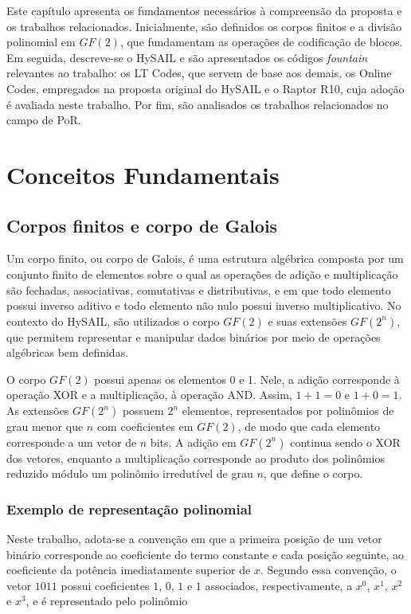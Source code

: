 Este capítulo apresenta os fundamentos necessários à compreensão da proposta e os trabalhos relacionados. Inicialmente, são definidos os corpos finitos e a divisão polinomial em $GF(2)$, que fundamentam as operações de codificação de blocos. Em seguida, descreve-se o HySAIL e são apresentados os códigos \emph{fountain} relevantes ao trabalho: os LT Codes, que servem de base aos demais, os Online Codes, empregados na proposta original do HySAIL e o Raptor R10, cuja adoção é avaliada neste trabalho. Por fim, são analisados os trabalhos relacionados no campo de \acrshort{PoR}.

\section{Conceitos Fundamentais}

\subsection{Corpos finitos e corpo de Galois}%
Um corpo finito, ou corpo de Galois, é uma estrutura algébrica composta por um conjunto finito de elementos sobre o qual as operações de adição e multiplicação são fechadas, associativas, comutativas e distributivas, e em que todo elemento possui inverso aditivo e todo elemento não nulo possui inverso multiplicativo. No contexto do HySAIL, são utilizados o corpo $GF(2)$ e suas extensões $GF(2^n)$, que permitem representar e manipular dados binários por meio de operações algébricas bem definidas.

O corpo $GF(2)$ possui apenas os elementos 0 e 1. Nele, a adição corresponde à operação XOR e a multiplicação, à operação AND. Assim, $1 + 1 = 0$ e $1 + 0 = 1$. As extensões $GF(2^n)$ possuem $2^n$ elementos, representados por polinômios de grau menor que $n$ com coeficientes em $GF(2)$, de modo que cada elemento corresponde a um vetor de $n$ bits. A adição em $GF(2^n)$ continua sendo o XOR dos vetores, enquanto a multiplicação corresponde ao produto dos polinômios reduzido módulo um polinômio irredutível de grau $n$, que define o corpo.

\subsubsection{Exemplo de representação polinomial}%
Neste trabalho, adota-se a convenção em que a primeira posição de um vetor binário corresponde ao coeficiente do termo constante e cada posição seguinte, ao coeficiente da potência imediatamente superior de $x$. Segundo essa convenção, o vetor $1011$ possui coeficientes $1$, $0$, $1$ e $1$ associados, respectivamente, a $x^0$, $x^1$, $x^2$ e $x^3$, e é representado pelo polinômio

